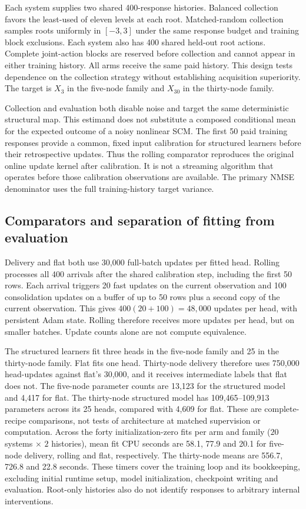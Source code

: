 Each system supplies two shared 400-response histories. Balanced collection
favors the least-used of eleven levels at each root. Matched-random collection
samples roots uniformly in $[-3,3]$ under the same response budget and training
block exclusions. Each system also has 400 shared held-out root actions. Complete joint-action blocks are
reserved before collection and cannot appear in either training history.
All arms receive the same paid history. This design tests dependence on the
collection strategy without establishing acquisition superiority. The target
is $X_3$ in the five-node family and $X_{30}$ in the thirty-node family.

Collection and evaluation both disable noise and target the same deterministic
structural map. This estimand does not substitute a composed conditional mean
for the expected outcome of a noisy nonlinear SCM. The first 50 paid training
responses provide a common, fixed input calibration for structured learners
before their retrospective updates. Thus the rolling comparator reproduces
the original online update kernel after calibration. It is not a streaming
algorithm that operates before those calibration observations are available.
The primary NMSE denominator uses the full training-history target variance.

\subsection{Comparators and separation of fitting from evaluation}
Delivery and flat both use 30,000 full-batch updates per fitted head. Rolling
processes all 400 arrivals after the shared calibration step, including the
first 50 rows. Each arrival triggers 20 fast updates on the current observation
and 100 consolidation updates on a buffer of up to 50 rows plus a second copy
of the current observation. This gives $400(20+100)=48{,}000$ updates per head,
with persistent Adam state. Rolling therefore receives more updates per head,
but on smaller batches. Update counts alone are not compute equivalence.

The structured learners fit three heads in the five-node family and 25 in the
thirty-node family. Flat fits one head. Thirty-node delivery therefore uses
750,000 head-updates against flat's 30,000, and it receives intermediate labels
that flat does not. The five-node parameter counts are 13,123 for the structured
model and 4,417 for flat. The thirty-node structured model has 109,465--109,913
parameters across its 25 heads, compared with 4,609 for flat.
These are complete-recipe comparisons, not tests of architecture at matched
supervision or computation. Across the forty initialization-zero fits per arm and family
($20$ systems $\times$ $2$ histories),
mean fit CPU seconds are 58.1, 77.9 and 20.1 for five-node delivery, rolling and
flat, respectively. The thirty-node means are 556.7, 726.8 and 22.8 seconds.
These timers cover the training loop and its bookkeeping, excluding initial
runtime setup, model initialization, checkpoint writing and evaluation.
Root-only histories also do not identify responses to arbitrary internal
interventions.

